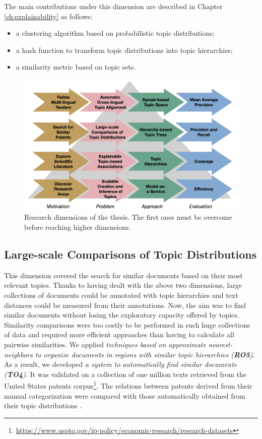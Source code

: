 The main contributions under this dimension are described in Chapter \ref{ch:explainability} as follows:
\begin{itemize}
\item a clustering algorithm based on probabilistic topic distributions;
\item a hash function to transform topic distributions into topic hierarchies;
\item a similarity metric based on topic sets.
\end{itemize} 

\begin{figure}[!htbp]
\includegraphics[scale=0.25]{dimensions.png}
\centering
\caption{Research dimensions of the thesis. The first ones must be overcome before reaching higher dimensions. }
\label{fig:dimensions}
\end{figure}

\subsection{Large-scale Comparisons of Topic Distributions}

This dimension covered the search for similar documents based on their most relevant topics. Thanks to having dealt with the above two dimensions, large collections of documents could be annotated with topic hierarchies and text distances could be measured from their annotations. Now, the aim was to find similar documents without losing the exploratory capacity offered by topics. Similarity comparisons were too costly to be performed in such huge collections of data and required more efficient approaches than having to calculate all pairwise similarities. We applied \textit{techniques based on approximate nearest-neighbors to organize documents in regions with similar topic hierarchies (\textbf{RO5})}. As a result, we developed \textit{a system to automatically find similar documents (\textbf{TO4})}. It was validated on a collection of one million texts retrieved from the United States patents corpus\footnote{\url{https://www.uspto.gov/ip-policy/economic-research/research-datasets}}. The relations between patents derived from their manual categorization were compared with those automatically obtained from their topic distributions \citep{Badenes-Olmedo2020, Badenes-Olmedo2019b}. 

